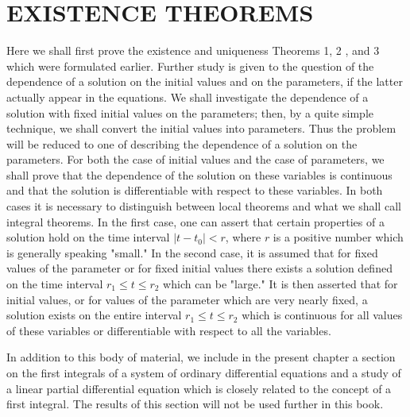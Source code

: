 \documentclass[10pt,a5paper]{book}
\theoremstyle{plain}
\theoremstyle{definition}
\theoremstyle{remark}
\begin{document}
\chapter{EXISTENCE THEOREMS}
Here we shall first prove the existence and uniqueness Theorems 1, 2 , and 3 which were formulated earlier. Further study is given to the question of the dependence of a solution on the initial values and on the parameters, if the latter actually appear in the equations. We shall investigate the dependence of a solution with fixed initial values on the parameters; then, by a quite simple technique, we shall convert the initial values into parameters. Thus the problem will be reduced to one of describing the dependence of a solution on the parameters. For both the case of initial values and the case of parameters, we shall prove that the dependence of the solution on these variables is continuous and that the solution is differentiable with respect to these variables. In both cases it is necessary to distinguish between local theorems and what we shall call integral theorems. In the first case, one can assert that certain properties of a solution hold on the time interval $\left|t-t_{0}\right|<r$, where $r$ is a positive number which is generally speaking "small." In the second case, it is assumed that for fixed values of the parameter or for fixed initial values there exists a solution defined on the time interval $r_{1} \leq t \leq r_{2}$ which can be "large." It is then asserted that for initial values, or for values of the parameter which are very nearly fixed, a solution exists on the entire interval $r_{1} \leq t \leq r_{2}$ which is continuous for all values of these variables or differentiable with respect to all the variables.

In addition to this body of material, we include in the present chapter a section on the first integrals of a system of ordinary differential equations and a study of a linear partial differential equation which is closely related to the concept of a first integral. The results of this section will not be used further in this book.
\end{document}
